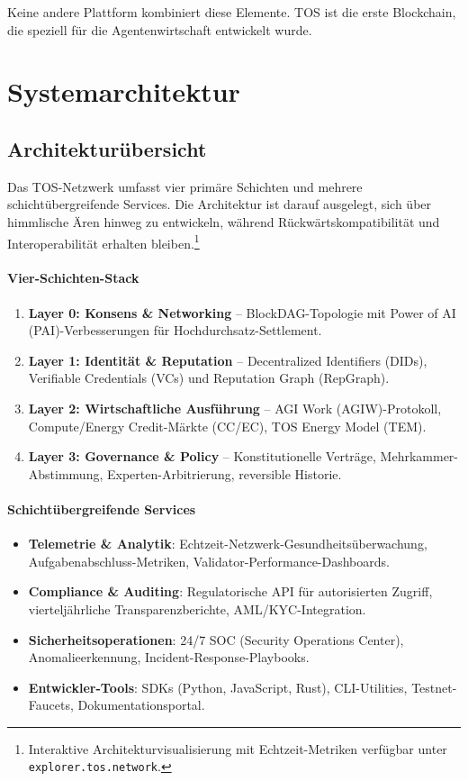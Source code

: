 \documentclass[11pt]{article}
\begin{document}
Keine andere Plattform kombiniert diese Elemente. TOS ist die erste Blockchain, die speziell für die Agentenwirtschaft entwickelt wurde.

\section{Systemarchitektur}
\subsection{Architekturübersicht}
Das TOS-Netzwerk umfasst vier primäre Schichten und mehrere schichtübergreifende Services. Die Architektur ist darauf ausgelegt, sich über himmlische Ären hinweg zu entwickeln, während Rückwärtskompatibilität und Interoperabilität erhalten bleiben.\footnote{Interaktive Architekturvisualisierung mit Echtzeit-Metriken verfügbar unter \texttt{explorer.tos.network}.}

\paragraph{Vier-Schichten-Stack}
\begin{enumerate}[noitemsep]
  \item \textbf{Layer 0: Konsens \& Networking} -- BlockDAG-Topologie mit Power of AI (PAI)-Verbesserungen für Hochdurchsatz-Settlement.
  \item \textbf{Layer 1: Identität \& Reputation} -- Decentralized Identifiers (DIDs), Verifiable Credentials (VCs) und Reputation Graph (RepGraph).
  \item \textbf{Layer 2: Wirtschaftliche Ausführung} -- AGI Work (AGIW)-Protokoll, Compute/Energy Credit-Märkte (CC/EC), TOS Energy Model (TEM).
  \item \textbf{Layer 3: Governance \& Policy} -- Konstitutionelle Verträge, Mehrkammer-Abstimmung, Experten-Arbitrierung, reversible Historie.
\end{enumerate}

\paragraph{Schichtübergreifende Services}
\begin{itemize}[noitemsep]
  \item \textbf{Telemetrie \& Analytik}: Echtzeit-Netzwerk-Gesundheitsüberwachung, Aufgabenabschluss-Metriken, Validator-Performance-Dashboards.
  \item \textbf{Compliance \& Auditing}: Regulatorische API für autorisierten Zugriff, vierteljährliche Transparenzberichte, AML/KYC-Integration.
  \item \textbf{Sicherheitsoperationen}: 24/7 SOC (Security Operations Center), Anomalieerkennung, Incident-Response-Playbooks.
  \item \textbf{Entwickler-Tools}: SDKs (Python, JavaScript, Rust), CLI-Utilities, Testnet-Faucets, Dokumentationsportal.
\end{itemize}
\end{document}

